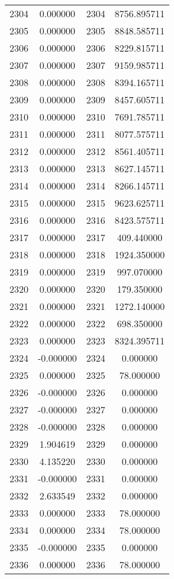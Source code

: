 \documentclass[12pt]{article}
\begin{document}
\begin{longtable}{@{}cccc@{}}
2304 & 0.000000 & 2304 & 8756.895711 \\
2305 & 0.000000 & 2305 & 8848.585711 \\
2306 & 0.000000 & 2306 & 8229.815711 \\
2307 & 0.000000 & 2307 & 9159.985711 \\
2308 & 0.000000 & 2308 & 8394.165711 \\
2309 & 0.000000 & 2309 & 8457.605711 \\
2310 & 0.000000 & 2310 & 7691.785711 \\
2311 & 0.000000 & 2311 & 8077.575711 \\
2312 & 0.000000 & 2312 & 8561.405711 \\
2313 & 0.000000 & 2313 & 8627.145711 \\
2314 & 0.000000 & 2314 & 8266.145711 \\
2315 & 0.000000 & 2315 & 9623.625711 \\
2316 & 0.000000 & 2316 & 8423.575711 \\
2317 & 0.000000 & 2317 & 409.440000 \\
2318 & 0.000000 & 2318 & 1924.350000 \\
2319 & 0.000000 & 2319 & 997.070000 \\
2320 & 0.000000 & 2320 & 179.350000 \\
2321 & 0.000000 & 2321 & 1272.140000 \\
2322 & 0.000000 & 2322 & 698.350000 \\
2323 & 0.000000 & 2323 & 8324.395711 \\
2324 & -0.000000 & 2324 & 0.000000 \\
2325 & 0.000000 & 2325 & 78.000000 \\
2326 & -0.000000 & 2326 & 0.000000 \\
2327 & -0.000000 & 2327 & 0.000000 \\
2328 & -0.000000 & 2328 & 0.000000 \\
2329 & 1.904619 & 2329 & 0.000000 \\
2330 & 4.135220 & 2330 & 0.000000 \\
2331 & -0.000000 & 2331 & 0.000000 \\
2332 & 2.633549 & 2332 & 0.000000 \\
2333 & 0.000000 & 2333 & 78.000000 \\
2334 & 0.000000 & 2334 & 78.000000 \\
2335 & -0.000000 & 2335 & 0.000000 \\
2336 & 0.000000 & 2336 & 78.000000 \\

\end{longtable}
\end{document}
